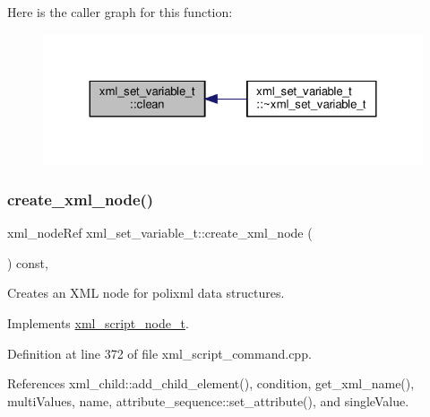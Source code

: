 Here is the caller graph for this function\+:
\nopagebreak
\begin{figure}[H]
\begin{center}
\leavevmode
\includegraphics[width=324pt]{dc/db4/classxml__set__variable__t_ac31d6bc914adb2a642e69adfabdb5f71_icgraph}
\end{center}
\end{figure}
\mbox{\label{classxml__set__variable__t_a95b663fe068ba84695f348fb6cea929b}} 
\subsubsection{\texorpdfstring{create\+\_\+xml\+\_\+node()}{create\_xml\_node()}}
{\footnotesize\ttfamily xml\+\_\+node\+Ref xml\+\_\+set\+\_\+variable\+\_\+t\+::create\+\_\+xml\+\_\+node (\begin{DoxyParamCaption}{ }\end{DoxyParamCaption}) const\hspace{0.3cm}{\ttfamily [override]}, {\ttfamily [virtual]}}



Creates an X\+ML node for polixml data structures. 



Implements \hyperlink{classxml__script__node__t_adaf9c51a079c4617f3845c6133eb477f}{xml\+\_\+script\+\_\+node\+\_\+t}.



Definition at line 372 of file xml\+\_\+script\+\_\+command.\+cpp.



References xml\+\_\+child\+::add\+\_\+child\+\_\+element(), condition, get\+\_\+xml\+\_\+name(), multi\+Values, name, attribute\+\_\+sequence\+::set\+\_\+attribute(), and single\+Value.

